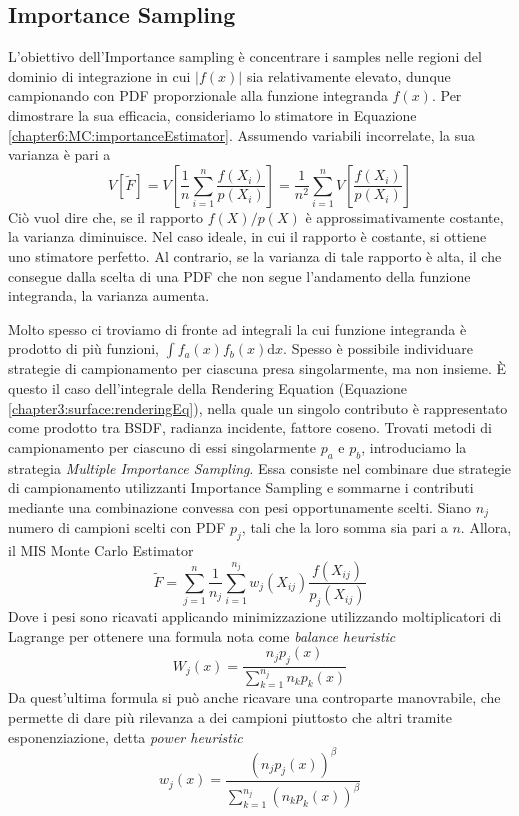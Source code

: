 \subsection{Importance Sampling}\label{chapter6:variance:importanceSampling}
L'obiettivo dell'Importance sampling \`e concentrare i samples nelle regioni del dominio di integrazione in cui $|f(x)|$ sia relativamente elevato, 
dunque campionando con PDF proporzionale alla funzione integranda $f(x)$. Per dimostrare la sua efficacia, consideriamo lo stimatore in 
Equazione \ref{chapter6:MC:importanceEstimator}. Assumendo variabili incorrelate, la sua varianza \`e pari a
\begin{equation}
	V[\tilde{F}]=V\left[\frac{1}{n}\sum_{i=1}^n\frac{f(X_i)}{p(X_i)}\right]=\frac{1}{n^2}\sum_{i=1}^nV\left[\frac{f(X_i)}{p(X_i)}\right]
\end{equation}
Ci\`o vuol dire che, se il rapporto $f(X)/p(X)$ \`e approssimativamente costante, la varianza diminuisce. Nel caso ideale, in cui il rapporto \`e 
costante, si ottiene uno stimatore perfetto. Al contrario, se la varianza di tale rapporto \`e alta, il che consegue dalla scelta di una PDF che 
non segue l'andamento della funzione integranda, la varianza aumenta.\par
Molto spesso ci troviamo di fronte ad integrali la cui funzione integranda \`e prodotto di pi\`u funzioni, $\int f_a(x)f_b(x)\mathrm{d}x$. Spesso
\`e possibile individuare strategie di campionamento per ciascuna presa singolarmente, ma non insieme. \`E questo il caso dell'integrale della 
Rendering Equation (Equazione \ref{chapter3:surface:renderingEq}), nella quale un singolo contributo \`e rappresentato come prodotto tra BSDF, 
radianza incidente, fattore coseno. Trovati metodi di campionamento per ciascuno di essi singolarmente $p_a$ e $p_b$, introduciamo la strategia
\textit{Multiple Importance Sampling}. Essa consiste nel combinare due strategie di campionamento utilizzanti Importance Sampling e sommarne i 
contributi mediante una combinazione convessa con pesi opportunamente scelti. Siano $n_j$ numero di campioni scelti con PDF $p_j$, tali che la loro
somma sia pari a $n$. Allora, il MIS Monte Carlo Estimator
\begin{equation}\label{chapter6:variance:MISMC}
	\tilde{F}=\sum_{j=1}^n\frac{1}{n_j}\sum_{i=1}^{n_j}w_j(X_{ij})\frac{f(X_{ij})}{p_j(X_{ij})}
\end{equation}
Dove i pesi sono ricavati applicando minimizzazione utilizzando moltiplicatori di Lagrange \cite{pegoraro} per ottenere una formula nota come 
\textit{balance heuristic}
\begin{equation}
	W_j(x)=\frac{n_jp_j(x)}{\sum_{k=1}^{n_j}n_kp_k(x)}
\end{equation}
Da quest'ultima formula si pu\`o anche ricavare una controparte manovrabile, che permette di dare pi\`u rilevanza a dei campioni piuttosto che altri 
tramite esponenziazione, detta \textit{power heuristic}
\begin{equation}
	w_j(x)=\frac{\left(n_jp_j(x)\right)^\beta}{\sum_{k=1}^{n_j}\left(n_kp_k(x)\right)^\beta}
\end{equation}
